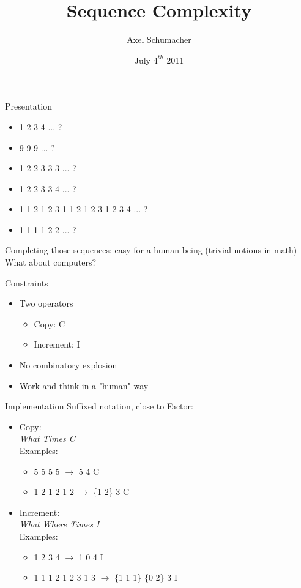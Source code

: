 \documentclass{beamer}
\title[Free Project]{Sequence Complexity}
\author{Axel Schumacher}
\institute{Télécom Paristech}
\date{July $4^{th}$ 2011}
\begin{document}
\begin{frame}
  \titlepage
\end{frame}

\begin{frame}{Presentation}
  \begin{itemize}
    \item{1 2 3 4 ... ?}
    \item{9 9 9 ... ?}
    \item{1 2 2 3 3 3 ... ?}
    \item{1 2 2 3 3 4 ... ?}
    \item{1 1 2 1 2 3 1 1 2 1 2 3 1 2 3 4 ... ?}
    \item{1 1 1 1 2 2 ... ? }
  \end{itemize}
  \begin{center}
  Completing those sequences: easy for a human being (trivial notions in math)\\
  What about computers?
  \end{center}
\end{frame}

\begin{frame}{Constraints}
  \begin{itemize}
    \item{
      Two operators
      \begin{itemize}
        \item{Copy: C}
        \item{Increment: I}
      \end{itemize}}
    \item{No combinatory explosion}
    \item{Work and think in a "human" way}
  \end{itemize}
\end{frame}

\begin{frame}{Implementation}
  Suffixed notation, close to Factor:\\
  \begin{itemize}
    \item{
      Copy:\\
      \textit{What Times C}\\
      Examples:
      \begin{itemize}
        \item{5 5 5 5 $\rightarrow$ 5 4 C}
        \item{1 2 1 2 1 2 $\rightarrow$ \{1 2\} 3 C}
      \end{itemize}}
    \item{
      Increment:\\
      \textit{What Where Times I}\\
      Examples:
      \begin{itemize}
        \item{1 2 3 4 $\rightarrow$ 1 0 4 I}
        \item{1 1 1 2 1 2 3 1 3 $\rightarrow$ \{1 1 1\} \{0 2\} 3 I}
      \end{itemize}}
  \end{itemize}
\end{frame}
\end{document}
